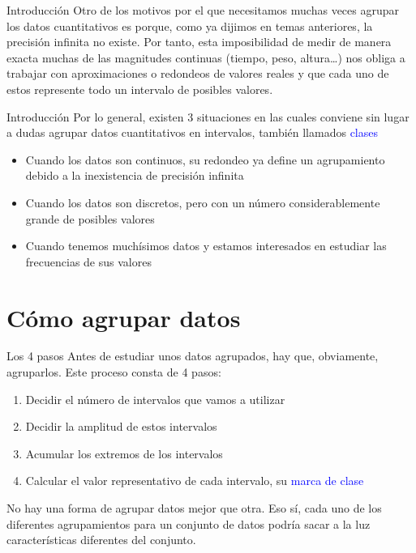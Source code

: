 \documentclass[
  ignorenonframetext,
  aspectratio=169]{beamer}
\providecommand{\tightlist}{%
  \setlength{\itemsep}{0pt}\setlength{\parskip}{0pt}}
\newcommand\blue[1]{\textcolor{blue}{#1}}
\begin{document}
\begin{frame}{Introducción}
\protect\hypertarget{introducciuxf3n-1}{}
Otro de los motivos por el que necesitamos muchas veces agrupar los
datos cuantitativos es porque, como ya dijimos en temas anteriores, la
precisión infinita no existe. Por tanto, esta imposibilidad de medir de
manera exacta muchas de las magnitudes continuas (tiempo, peso,
altura\ldots) nos obliga a trabajar con aproximaciones o redondeos de
valores reales y que cada uno de estos represente todo un intervalo de
posibles valores.
\end{frame}

\begin{frame}{Introducción}
\protect\hypertarget{introducciuxf3n-2}{}
Por lo general, existen 3 situaciones en las cuales conviene sin lugar a
dudas agrupar datos cuantitativos en intervalos, también llamados
\blue{clases}

\begin{itemize}
\tightlist
\item
  Cuando los datos son continuos, su redondeo ya define un agrupamiento
  debido a la inexistencia de precisión infinita
\item
  Cuando los datos son discretos, pero con un número considerablemente
  grande de posibles valores
\item
  Cuando tenemos muchísimos datos y estamos interesados en estudiar las
  frecuencias de sus valores
\end{itemize}
\end{frame}

\hypertarget{cuxf3mo-agrupar-datos}{%
\section{Cómo agrupar datos}\label{cuxf3mo-agrupar-datos}}

\begin{frame}{Los 4 pasos}
\protect\hypertarget{los-4-pasos}{}
Antes de estudiar unos datos agrupados, hay que, obviamente, agruparlos.
Este proceso consta de 4 pasos:

\begin{enumerate}
\tightlist
\item
  Decidir el número de intervalos que vamos a utilizar
\item
  Decidir la amplitud de estos intervalos
\item
  Acumular los extremos de los intervalos
\item
  Calcular el valor representativo de cada intervalo, su
  \blue{marca de clase}
\end{enumerate}

No hay una forma de agrupar datos mejor que otra. Eso sí, cada uno de
los diferentes agrupamientos para un conjunto de datos podría sacar a la
luz características diferentes del conjunto.
\end{frame}
\end{document}
